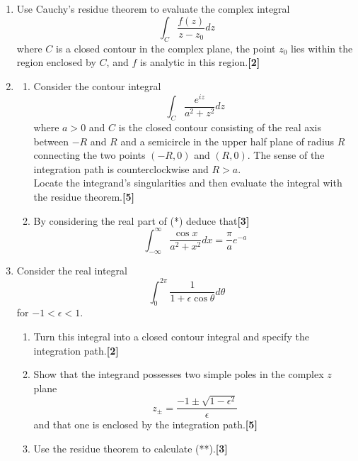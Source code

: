 \documentclass[a4paper]{article}
\begin{document}
\begin{qns}\leavevmode
\begin{enumerate}[label=(\roman*)]
\item Use Cauchy’s residue theorem to evaluate the complex integral
$$\int_C\frac{f(z)}{z-z_0}dz$$
where $C$ is a closed contour in the complex plane, the point $z_0$ lies within the region enclosed by $C$, and $f$ is analytic in this region.\hfill\textbf{[2]}\\[5pt]
\item
\begin{enumerate}[label=(\alph*)]
\item Consider the contour integral
\begin{equation}
    \int_C\frac{e^{iz}}{a^2+z^2}dz\tag{*}
\end{equation}
where $a > 0$ and $C$ is the closed contour consisting of the real axis between $−R$ and $R$ and a semicircle in the upper half plane of radius $R$ connecting the two points $(−R, 0)$ and $(R, 0)$. The sense of the integration path is counterclockwise and $R > a$.\\[5pt]
Locate the integrand’s singularities and then evaluate the integral with the residue theorem.\hfill\textbf{[5]}
\item By considering the real part of (*) deduce that\hfill\textbf{[3]}
$$\int_{-\infty}^\infty\frac{\cos x}{a^2+x^2}dx=\frac{\pi}{a}e^{-a}$$
\end{enumerate}
\item Consider the real integral 
\begin{equation}
  \int_0^{2\pi}\frac{1}{1+\epsilon\cos\theta}d\theta\tag{**}  
\end{equation}
for $−1 <\epsilon < 1$.
\begin{enumerate}[label=(\alph*)]
\item Turn this integral into a closed contour integral and specify the integration path.\hfill\textbf{[2]}
\item Show that the integrand possesses two simple poles in the complex $z$ plane
$$z_\pm=\frac{-1\pm\sqrt{1-\epsilon^2}}{\epsilon}$$
and that one is enclosed by the integration path.\hfill\textbf{[5]}
\item Use the residue theorem to calculate (**).\hfill\textbf{[3]}
\end{enumerate}
\end{enumerate}
\end{qns}
\end{document}
